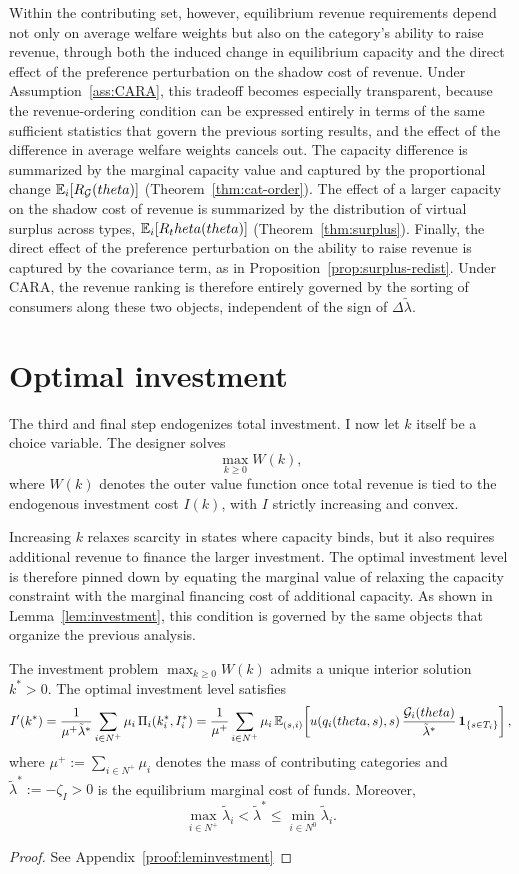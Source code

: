 \documentclass{class}
\begin{document}
Within the contributing set, however, equilibrium revenue requirements depend not only on average welfare weights but also on the category's ability to raise revenue, through both the induced change in equilibrium capacity and the direct effect of the preference perturbation on the shadow cost of revenue. Under Assumption~\ref{ass:CARA}, this tradeoff becomes especially transparent, because the revenue-ordering condition can be expressed entirely in terms of the same sufficient statistics that govern the previous sorting results, and the effect of the difference in average welfare weights cancels out. The capacity difference is summarized by the marginal capacity value and captured by the proportional change $\mathbb{E}_i[R_{\mathcal{G}}(theta)]$ (Theorem~\ref{thm:cat-order}). The effect of a larger capacity on the shadow cost of revenue is summarized by the distribution of virtual surplus across types, $\mathbb{E}_i[R_theta(theta)]$ (Theorem~\ref{thm:surplus}). Finally, the direct effect of the preference perturbation on the ability to raise revenue is captured by the covariance term, as in Proposition~\ref{prop:surplus-redist}. Under CARA, the revenue ranking is therefore entirely governed by the sorting of consumers along these two objects, independent of the sign of $\Delta\tilde\lambda$.

\section{Optimal investment}
The third and final step endogenizes total investment. I now let \(k\) itself be a choice variable. The designer solves
\[
\max_{k\geq 0} W(k),
\]
where \(W(k)\) denotes the outer value function once total revenue is tied to the endogenous investment cost \(I(k)\), with \(I\) strictly increasing and convex.

Increasing \(k\) relaxes scarcity in states where capacity binds, but it also requires additional revenue to finance the larger investment. The optimal investment level is therefore pinned down by equating the marginal value of relaxing the capacity constraint with the marginal financing cost of additional capacity. As shown in Lemma~\ref{lem:investment}, this condition is governed by the same objects that organize the previous analysis.

\begin{lemma}\label{lem:investment}
The investment problem \(\max_{k\geq 0} W(k)\) admits a unique interior solution \(k^\ast > 0\). The optimal investment level satisfies
\[
I'(k^\ast)
= \frac{1}{\mu^+\tilde\lambda^\ast}\sum_{i\in N^+}\mu_i\,\Pi_i(k_i^\ast,I_i^\ast)=
\frac{1}{\mu^+}
\sum_{i\in N^+} \mu_i\,
\mathbb{E}_{(s,i)}\!\left[
u(q_i(theta,s),s)\,
\frac{\mathcal{G}_i(theta)}{\tilde\lambda^\ast}\,
\mathbf{1}_{\{s\in T_i\}}
\right],
\]
where \(\mu^+ := \sum_{i\in N^+}\mu_i\) denotes the mass of contributing categories and \(\tilde\lambda^\ast := -\zeta_I > 0\) is the equilibrium marginal cost of funds. Moreover,
\[
\max_{i \in N^+} \tilde\lambda_i < \tilde\lambda^\ast \leq \min_{i \in N^0} \tilde\lambda_i.
\]
\end{lemma}
\begin{proof}
    See Appendix~\ref{proof:leminvestment}
\end{proof}
\end{document}

